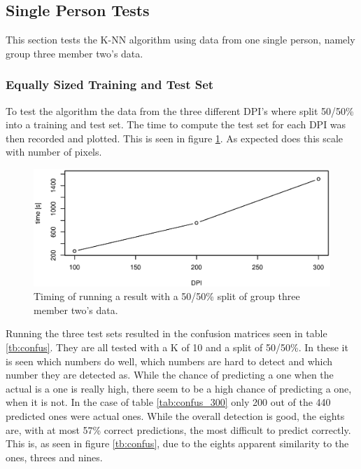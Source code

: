 

\subsection{Single Person Tests}
This section tests the K-NN algorithm using data from one single person, namely group three member two's data.
%
%
%
%

\subsubsection{Equally Sized Training and Test Set}
To test the algorithm the data from the three different DPI's where split 50/50\% into a training and test set. 
The time to compute the test set for each DPI was then recorded and plotted. This is seen in figure \ref{fig:PersonDependent_5050}.
As expected does this scale with number of pixels. 

\begin{figure}[h]
\centering
\includegraphics[width=\textwidth]{graphics/time_vs_dpi}
\caption{Timing of running a result with a 50/50\% split of group three member two's data.}
\label{fig:PersonDependent_5050}
\end{figure}

Running the three test sets resulted in the confusion matrices seen in table \ref{tb:confus}.
They are all tested with a K of 10 and a split of 50/50\%.
In these it is seen which numbers do well, which numbers are hard to detect and which number they are detected as.
While the chance of predicting a one when the actual is a one is really high, there seem to be a high chance of predicting a one, when it is not. 
In the case of table \ref{tab:confus_300} only 200 out of the 440 predicted ones were actual ones.
While the overall detection is good, the eights are, with at most 57\% correct predictions, the most difficult to predict correctly. 
This is, as seen in figure \ref{tb:confus}, due to the eights apparent similarity to the ones, threes and nines.


